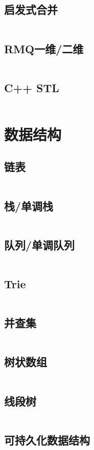 \documentclass[a4paper,12pt]{article}
\begin{document}
\subsection{启发式合并}
\inputminted[breaklines]{c++}{basic/heuristic_merge.cc}
\subsection{RMQ一维/二维}
\inputminted[breaklines]{c++}{basic/rmq.cc}
\subsection{C++ STL}
\inputminted[breaklines]{md}{basic/stl.cc}

\newpage
\section{数据结构}
\subsection{链表}
\inputminted[breaklines]{c++}{ds/list.cc}
\subsection{栈/单调栈}
\inputminted[breaklines]{c++}{ds/stack.cc}
\subsection{队列/单调队列}
\inputminted[breaklines]{c++}{ds/queue.cc}
\subsection{Trie}
\inputminted[breaklines]{c++}{ds/trie.cc}
\subsection{并查集}
\inputminted[breaklines]{c++}{ds/dsu.cc}
\subsection{树状数组}
\inputminted[breaklines]{c++}{ds/tree_array.cc}
\subsection{线段树}
\inputminted[breaklines]{c++}{ds/seg_tree.cc}
\subsection{可持久化数据结构}
\end{document}
